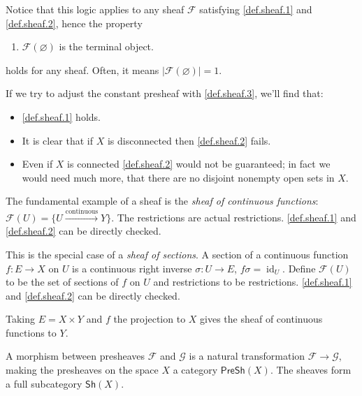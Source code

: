 \begin{remark}
    Notice that this logic applies to any sheaf $\mathcal{F}$ satisfying \ref{def.sheaf.1} and \ref{def.sheaf.2}, hence the property
    \begin{enumerate}[resume*=sheaf]
        \item\label{def.sheaf.3} $\mathcal{F}(\varnothing)$ is the terminal object.
    \end{enumerate}
    holds for any sheaf. Often, it means $|\mathcal{F}(\varnothing)|=1$.
\end{remark}


If we try to adjust the constant presheaf with \ref{def.sheaf.3}, we'll find that: 
\begin{itemize}
    \item \ref{def.sheaf.1} holds.
    \item It is clear that if $X$ is disconnected then \ref{def.sheaf.2} fails.
    \item Even if $X$ is connected \ref{def.sheaf.2} would not be guaranteed; in fact we would need much more, that there are no disjoint nonempty open sets in $X$.
\end{itemize}

\begin{example}
    The fundamental example of a sheaf is the \emph{sheaf of continuous functions}: $\mathcal{F}(U)=\{U\xrightarrow{\text{continuous}}Y\}$. The restrictions are actual restrictions. \ref{def.sheaf.1} and \ref{def.sheaf.2} can be directly checked.
    
    This is the special case of a \emph{sheaf of sections}. A section of a continuous function $f:E\to X$ on $U$ is a continuous right inverse $\sigma:U\to E$, $f\sigma=\operatorname{id}_U$. Define $\mathcal{F}(U)$ to be the set of sections of $f$ on $U$ and restrictions to be restrictions. \ref{def.sheaf.1} and \ref{def.sheaf.2} can be directly checked.

    Taking $E=X\times Y$ and $f$ the projection to $X$ gives the sheaf of continuous functions to $Y$.
\end{example}

\begin{definition}
    A morphism between presheaves $\mathcal{F}$ and $\mathcal{G}$ is a natural transformation $\mathcal{F}\to\mathcal{G}$, making the presheaves on the space $X$ a category $\mathsf{PreSh}(X)$. The sheaves form a full subcategory $\mathsf{Sh}(X)$.
\end{definition}

